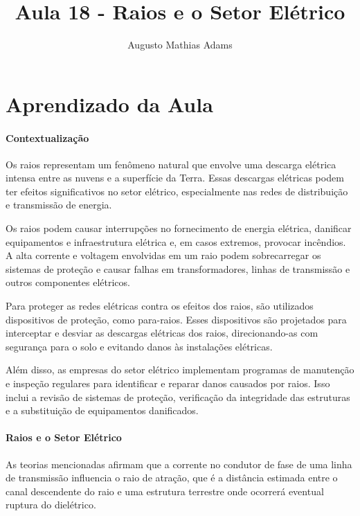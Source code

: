 \documentclass[a4paper, 12pt, onecolumn,singlespacing]{article}
\title{Aula 18 - Raios e o Setor Elétrico}
\author[1]{Augusto Mathias Adams}
\affil[1]{augusto.adams@ufpr.br}
\begin{document}
	
	\maketitle
	
	\section{Aprendizado da Aula}
	
	\paragraph{Contextualização}
	
	Os raios representam um fenômeno natural que envolve uma descarga elétrica intensa entre as nuvens e a superfície da Terra. Essas descargas elétricas podem ter efeitos significativos no setor elétrico, especialmente nas redes de distribuição e transmissão de energia.
	
	Os raios podem causar interrupções no fornecimento de energia elétrica, danificar equipamentos e infraestrutura elétrica e, em casos extremos, provocar incêndios. A alta corrente e voltagem envolvidas em um raio podem sobrecarregar os sistemas de proteção e causar falhas em transformadores, linhas de transmissão e outros componentes elétricos.
	
	Para proteger as redes elétricas contra os efeitos dos raios, são utilizados dispositivos de proteção, como para-raios. Esses dispositivos são projetados para interceptar e desviar as descargas elétricas dos raios, direcionando-as com segurança para o solo e evitando danos às instalações elétricas.
	
	Além disso, as empresas do setor elétrico implementam programas de manutenção e inspeção regulares para identificar e reparar danos causados por raios. Isso inclui a revisão de sistemas de proteção, verificação da integridade das estruturas e a substituição de equipamentos danificados.
	
	\paragraph{Raios e o Setor Elétrico}
	
	As teorias mencionadas afirmam que a corrente no condutor de fase de uma linha de transmissão influencia o raio de atração, que é a distância estimada entre o canal descendente do raio e uma estrutura terrestre onde ocorrerá eventual ruptura do dielétrico.
	
\end{document}

